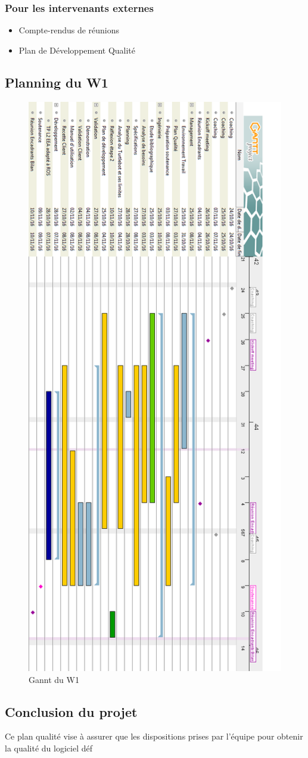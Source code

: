 \documentclass[10pt,a4paper]{article}
\begin{document}
\subsubsection{Pour les intervenants externes}
\begin{itemize}
\item Compte-rendus de réunions 
\item Plan de Développement Qualité
\end{itemize}

\subsection{Planning du W1}

\begin{figure}
  \centering
  \noindent\includegraphics[width=13.5cm]{W1.png} 
  \caption{Gannt du W1}
\end{figure}

\subsection{Conclusion du projet}

Ce plan qualité vise à assurer que les dispositions prises par l’équipe pour obtenir la qualité du logiciel déf
\end{document}

